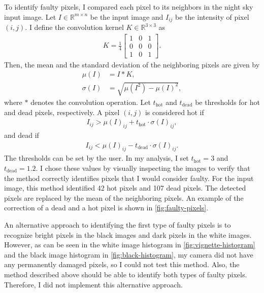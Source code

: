 To identify faulty pixels, I compared each pixel to its neighbors in the night sky input
image. Let $I \in \mathbb{R}^{m \times n}$ be the input image and $I_{ij}$ be the
intensity of pixel $(i,j)$. I define the convolution kernel $K \in \mathbb{R}^{3 \times
    3}$ as
\begin{align*}
  K = \frac{1}{4} \begin{bmatrix}
                    1 & 0 & 1 \\
                    0 & 0 & 0 \\
                    1 & 0 & 1
                  \end{bmatrix}.
\end{align*}
Then, the mean and the standard deviation of the neighboring pixels are given by
\begin{align*}
  \mu(I)    & = I \ast K,                       \\
  \sigma(I) & = \sqrt{\mu(I^{2}) - \mu(I)^{2}},
\end{align*}
where $\ast$ denotes the convolution operation. Let $t_{\text{hot}}$ and $t_{\text{dead}}$
be thresholds for hot and dead pixels, respectively. A pixel $(i,j)$ is considered hot if
\begin{align*}
  I_{ij} > \mu(I)_{ij} + t_{\text{hot}} \cdot \sigma(I)_{ij},
\end{align*}
and dead if
\begin{align*}
  I_{ij} < \mu(I)_{ij} - t_{\text{dead}} \cdot \sigma(I)_{ij}.
\end{align*}
The thresholds can be set by the user. In my analysis, I set $t_{\text{hot}} = 3$ and
$t_{\text{dead}} = 1.2$. I chose these values by visually inspecting the images to verify
that the method correctly identifies pixels that I would consider faulty. For the input
image, this method identified 42 hot pixels and 107 dead pixels. The detected pixels are
replaced by the mean of the neighboring pixels. An example of the correction of a dead and
a hot pixel is shown in \autoref{fig:faulty-pixels}.

An alternative approach to identifying the first type of faulty pixels is to recognize
bright pixels in the black images and dark pixels in the white images. However, as can be
seen in the white image histogram in \autoref{fig:vignette-histogram} and the black image
histogram in \autoref{fig:black-histogram}, my camera did not have any permanently damaged
pixels, so I could not test this method. Also, the method described above should be able
to identify both types of faulty pixels. Therefore, I did not implement this alternative
approach.



